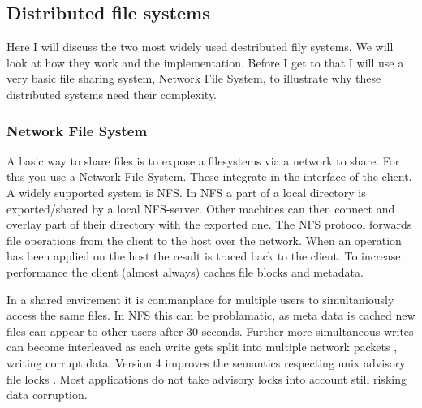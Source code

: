 \subsection{Distributed file systems}
Here I will discuss the two most widely used destributed fily systems. We will look at how they work and the implementation. Before I get to that I will use a very basic file sharing system, Network File System, to illustrate why these distributed systems need their complexity.



\subsubsection*{Network File System}
A basic way to share files is to expose a filesystems via a network to share. For this you use a Network File System. These integrate in the interface of the client. A widely supported system is \textsc{NFS}. In \textsc{NFS} a part of a local directory is exported/shared by a local \textsc{NFS}-server. Other machines can then connect and overlay part of their directory with the exported one. The NFS protocol forwards file operations from the client to the host over the network. When an operation has been applied on the host the result is traced back to the client. To increase performance the client (almost always) caches file blocks and metadata. 

In a shared envirement it is commanplace for multiple users to simultaniously access the same files. In \textsc{NFS} this can be problamatic, as meta data is cached new files can appear to other users after 30 seconds. Further more simultaneous writes can become interleaved as each write gets split into multiple network packets \cite[p. 527]{os}, writing corrupt data. Version 4 improves the semantics respecting unix advisory file locks \cite{rfc3530}. Most applications do not take advisory locks into account still risking data corruption. 

